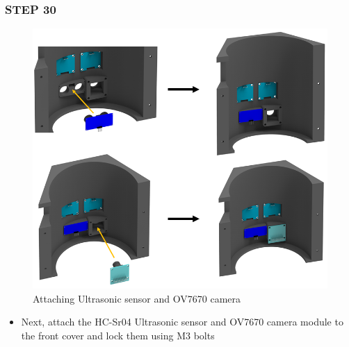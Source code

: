 \documentclass[12pt,a4paper,oneside]{book}
\begin{document}
			\subsubsection*{STEP 30}
				\begin{figure}[H]
					\begin{center}
						\includegraphics[scale=0.6]{ATTACHING ULTRASONIC AND CAMERA}
						\caption{Attaching Ultrasonic sensor and OV7670 camera}
					\end{center}
				\end{figure}
				\begin{itemize}
					\item Next, attach the HC-Sr04 Ultrasonic sensor and OV7670 camera module to the front cover and lock them using M3 bolts
				\end{itemize}
				
\end{document}

